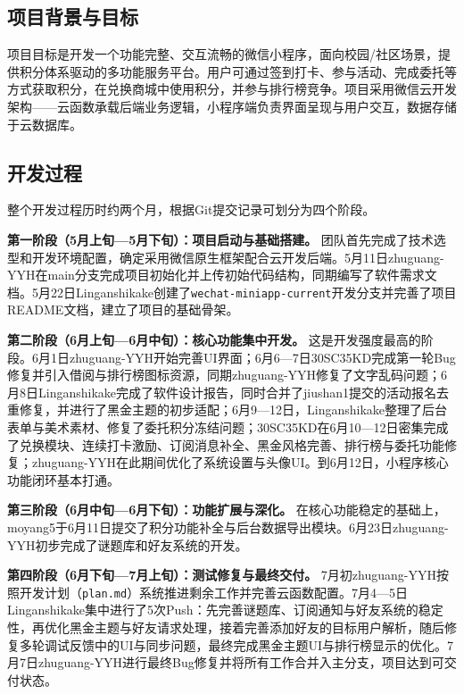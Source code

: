 \documentclass[a4paper,12pt]{article}
\begin{document}
\subsection{项目背景与目标}

项目目标是开发一个功能完整、交互流畅的微信小程序，面向校园/社区场景，提供积分体系驱动的多功能服务平台。用户可通过签到打卡、参与活动、完成委托等方式获取积分，在兑换商城中使用积分，并参与排行榜竞争。项目采用微信云开发架构——云函数承载后端业务逻辑，小程序端负责界面呈现与用户交互，数据存储于云数据库。

\subsection{开发过程}

整个开发过程历时约两个月，根据Git提交记录可划分为四个阶段。

\textbf{第一阶段（5月上旬—5月下旬）：项目启动与基础搭建。}
团队首先完成了技术选型和开发环境配置，确定采用微信原生框架配合云开发后端。5月11日zhuguang-YYH在main分支完成项目初始化并上传初始代码结构，同期编写了软件需求文档。5月22日Linganshikake创建了\texttt{wechat-miniapp-current}开发分支并完善了项目README文档，建立了项目的基础骨架。

\textbf{第二阶段（6月上旬—6月中旬）：核心功能集中开发。}
这是开发强度最高的阶段。6月1日zhuguang-YYH开始完善UI界面；6月6—7日30SC35KD完成第一轮Bug修复并引入借阅与排行榜图标资源，同期zhuguang-YYH修复了文字乱码问题；6月8日Linganshikake完成了软件设计报告，同时合并了jiushan1提交的活动报名去重修复，并进行了黑金主题的初步适配；6月9—12日，Linganshikake整理了后台表单与美术素材、修复了委托积分冻结问题；30SC35KD在6月10—12日密集完成了兑换模块、连续打卡激励、订阅消息补全、黑金风格完善、排行榜与委托功能修复；zhuguang-YYH在此期间优化了系统设置与头像UI。到6月12日，小程序核心功能闭环基本打通。

\textbf{第三阶段（6月中旬—6月下旬）：功能扩展与深化。}
在核心功能稳定的基础上，moyang5于6月11日提交了积分功能补全与后台数据导出模块。6月23日zhuguang-YYH初步完成了谜题库和好友系统的开发。

\textbf{第四阶段（6月下旬—7月上旬）：测试修复与最终交付。}
7月初zhuguang-YYH按照开发计划（\texttt{plan.md}）系统推进剩余工作并完善云函数配置。7月4—5日Linganshikake集中进行了5次Push：先完善谜题库、订阅通知与好友系统的稳定性，再优化黑金主题与好友请求处理，接着完善添加好友的目标用户解析，随后修复多轮调试反馈中的UI与同步问题，最终完成黑金主题UI与排行榜显示的优化。7月7日zhuguang-YYH进行最终Bug修复并将所有工作合并入主分支，项目达到可交付状态。
\end{document}

